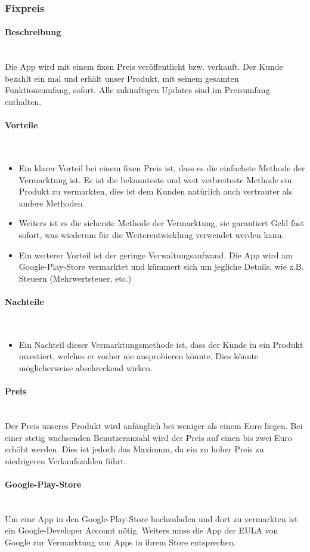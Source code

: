 \documentclass[FIPLY_base.tex]{subfiles}
\begin{document}
	
\subsubsection{Fixpreis}

\paragraph{Beschreibung}\ \\
Die App wird mit einem fixen Preis veröffentlicht bzw. verkauft.
Der Kunde bezahlt ein mal und erhält unser Produkt, mit seinem gesamten Funktionsumfang, sofort.
Alle zukünftigen Updates sind im Preisumfang enthalten.

\paragraph{Vorteile}\ \\
\begin{itemize}

\item Ein klarer Vorteil bei einem fixen Preis ist, dass es die einfachste Methode der Vermarktung ist.
Es ist die bekannteste und weit verbreiteste Methode ein Produkt zu vermarkten, dies ist dem Kunden natürlich auch vertrauter als andere Methoden.

\item Weiters ist es die sicherste Methode der Vermarktung, sie garantiert Geld fast sofort, was wiederum für die Weiterentwicklung verwendet werden kann.

\item Ein weiterer Vorteil ist der geringe Verwaltungsaufwand. Die App wird am Google-Play-Store vermarktet
und kümmert sich um jegliche Details, wie z.B. Steuern (Mehrwertsteuer, etc.)

\end{itemize}

\paragraph{Nachteile}\ \\
\begin{itemize}
\item Ein Nachteil dieser Vermarktungsmethode ist, dass der Kunde in ein Produkt investiert, welches er vorher nie ausprobieren könnte.
Dies könnte möglicherweise abschreckend wirken.
\end{itemize}

\paragraph{Preis}\ \\
Der Preis unseres Produkt wird anfänglich bei weniger als einem Euro liegen.
Bei einer stetig wachsenden Benutzeranzahl wird der Preis auf einen bis zwei Euro erhöht werden.
Dies ist jedoch das Maximum, da ein zu hoher Preis zu niedrigeren Verkaufszahlen führt.

\paragraph{Google-Play-Store}\ \\
Um eine App in den Google-Play-Store hochzuladen und dort zu vermarkten ist ein Google-Developer Account nötig.
Weiters muss die App der EULA von Google zur Vermarktung von Apps in ihrem Store entsprechen.
\end{document}
